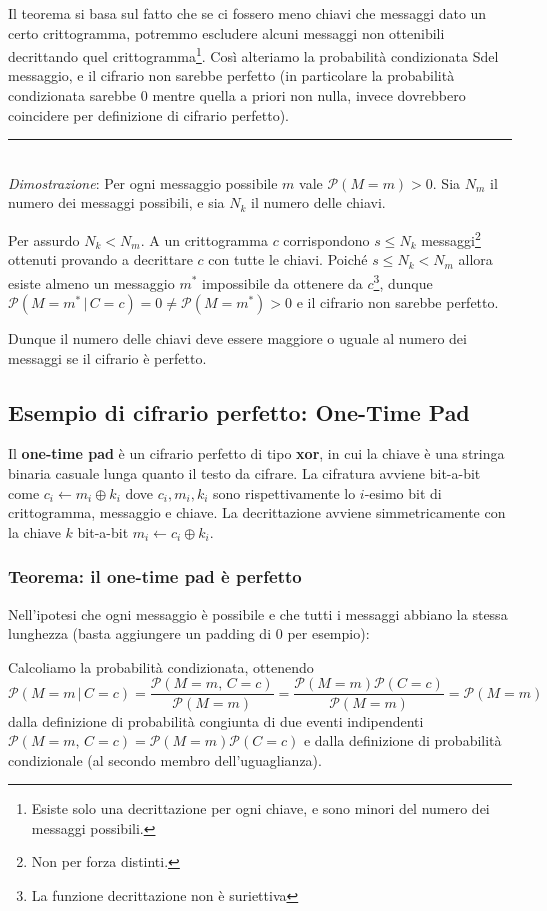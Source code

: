 \documentclass{article}
\begin{document}
Il teorema si basa sul fatto che se ci fossero meno chiavi che messaggi dato un certo crittogramma, potremmo escludere alcuni messaggi non ottenibili decrittando quel crittogramma\footnote{Esiste solo una decrittazione per ogni chiave, e sono minori del numero dei messaggi possibili.}. Così alteriamo la probabilità condizionata Sdel messaggio, e il cifrario non sarebbe perfetto (in particolare la probabilità condizionata sarebbe $0$ mentre quella a priori non nulla, invece dovrebbero coincidere per definizione di cifrario perfetto).\\
\hrule
\ \\
\textit{Dimostrazione}: Per ogni messaggio possibile $m$ vale $\mathcal{P}(M=m)>0$. Sia $N_m$ il numero dei messaggi possibili, e sia $N_k$ il numero delle chiavi.
 
 Per assurdo $N_k<N_m$. A un crittogramma $c$ corrispondono $s\le N_k$ messaggi\footnote{Non per forza distinti.} ottenuti provando a decrittare $c$ con tutte le chiavi. Poiché $s\le N_k < N_m$ allora esiste almeno un messaggio $m^*$ impossibile da ottenere da $c$\footnote{La funzione decrittazione non è suriettiva}, dunque $\mathcal{P}(M=m^*\,|\,C=c)=0\ne \mathcal{P}(M=m^*)>0$ e il cifrario non sarebbe perfetto.
 
 Dunque il numero delle chiavi deve essere maggiore o uguale al numero dei messaggi se il cifrario è perfetto.
 
 \subsection{Esempio di cifrario perfetto: One-Time Pad}
 
 Il \textbf{one-time pad} è un cifrario perfetto di tipo \textbf{xor}, in cui la chiave è una stringa binaria casuale lunga quanto il testo da cifrare.
 La cifratura avviene bit-a-bit come $c_i\leftarrow m_i\oplus k_i$ dove $c_i,m_i,k_i$ sono rispettivamente lo $i$-esimo bit di crittogramma, messaggio e chiave. La decrittazione avviene simmetricamente con la chiave $k$ bit-a-bit $m_i\leftarrow c_i\oplus k_i$. 
 
 \subsubsection{Teorema: il one-time pad è perfetto}
 Nell'ipotesi che ogni messaggio è possibile e che tutti i messaggi abbiano la stessa lunghezza (basta aggiungere un padding di $0$ per esempio):
 
 Calcoliamo la probabilità condizionata, ottenendo \[
 \mathcal{P}(M=m\,|\,C=c)=\frac{\mathcal{P}(M=m,\,C=c)}{\mathcal{P}(M=m)}=\frac{\mathcal{P}(M=m)\mathcal{P}(C=c)}{\mathcal{P}(M=m)}=\mathcal{P}(M=m)
 \]
 dalla definizione di probabilità congiunta di due eventi indipendenti $\mathcal{P}(M=m,\,C=c)=\mathcal{P}(M=m)\mathcal{P}(C=c)$ e dalla definizione di probabilità condizionale (al secondo membro dell'uguaglianza).
 
\end{document}
